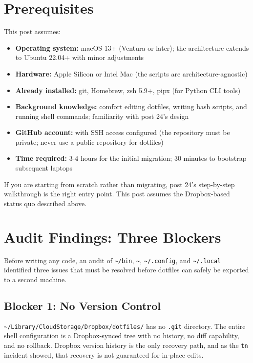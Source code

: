 \documentclass[
  11pt,
  letterpaper,
  DIV=11,
  numbers=noendperiod]{scrartcl}
\providecommand{\tightlist}{%
  \setlength{\itemsep}{0pt}\setlength{\parskip}{0pt}}
\begin{document}
\section{Prerequisites}\label{prerequisites}

This post assumes:

\begin{itemize}
\tightlist
\item
  \textbf{Operating system:} macOS 13+ (Ventura or later); the
  architecture extends to Ubuntu 22.04+ with minor adjustments
\item
  \textbf{Hardware:} Apple Silicon or Intel Mac (the scripts are
  architecture-agnostic)
\item
  \textbf{Already installed:} git, Homebrew, zsh 5.9+, pipx (for Python
  CLI tools)
\item
  \textbf{Background knowledge:} comfort editing dotfiles, writing bash
  scripts, and running shell commands; familiarity with post 24's design
\item
  \textbf{GitHub account:} with SSH access configured (the repository
  must be private; never use a public repository for dotfiles)
\item
  \textbf{Time required:} 3-4 hours for the initial migration; 30
  minutes to bootstrap subsequent laptops
\end{itemize}

If you are starting from scratch rather than migrating, post 24's
step-by-step walkthrough is the right entry point. This post assumes the
Dropbox-based status quo described above.

\section{Audit Findings: Three
Blockers}\label{audit-findings-three-blockers}

Before writing any code, an audit of \texttt{\textasciitilde{}/bin},
\texttt{\textasciitilde{}}, \texttt{\textasciitilde{}/.config}, and
\texttt{\textasciitilde{}/.local} identified three issues that must be
resolved before dotfiles can safely be exported to a second machine.

\subsection{Blocker 1: No Version
Control}\label{blocker-1-no-version-control}

\texttt{\textasciitilde{}/Library/CloudStorage/Dropbox/dotfiles/} has no
\texttt{.git} directory. The entire shell configuration is a
Dropbox-synced tree with no history, no diff capability, and no
rollback. Dropbox version history is the only recovery path, and as the
\texttt{tn} incident showed, that recovery is not guaranteed for
in-place edits.
\end{document}
